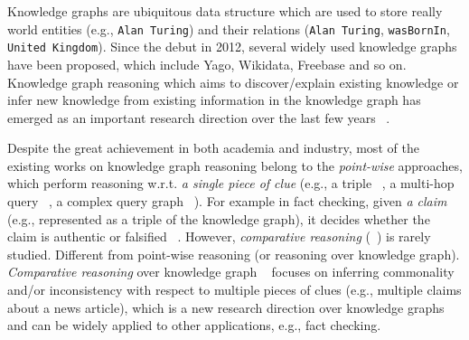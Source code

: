 



Knowledge graphs are ubiquitous data structure which are used to store really world entities (e.g., {\tt Alan Turing}) and their relations ({\tt Alan Turing}, {\tt wasBornIn}, {\tt United Kingdom}).
Since the debut in 2012, several widely used knowledge graphs have been proposed, which include Yago, Wikidata, Freebase and so on.
Knowledge graph reasoning which aims to discover/explain existing knowledge or infer new knowledge from existing information in the knowledge graph has emerged as an important research direction over the last few years ~\cite{binet}.





Despite the great achievement in both academia and industry,
most of the existing works on knowledge graph reasoning belong to the {\em point-wise} approaches, which perform reasoning w.r.t. {\em a single piece of clue} (e.g., a triple ~\cite{transE}, a multi-hop query ~\cite{binet}, a complex query graph ~\cite{lihui}). For example in fact checking, given {\em a claim} (e.g., represented as a triple of the knowledge graph), it decides whether the claim is authentic or falsified ~\cite{kgminer, KL}.
However, {\em comparative reasoning} (~\cite{kompare, prototype_liu}) is rarely studied.
Different from point-wise reasoning (or reasoning over knowledge graph).
{\em Comparative reasoning} over knowledge graph ~\cite{kompare} focuses on inferring commonality and/or inconsistency with respect to multiple pieces of clues (e.g., multiple claims about a news article), which is a new research direction over knowledge graphs and can be widely applied to other applications, e.g., fact checking.



